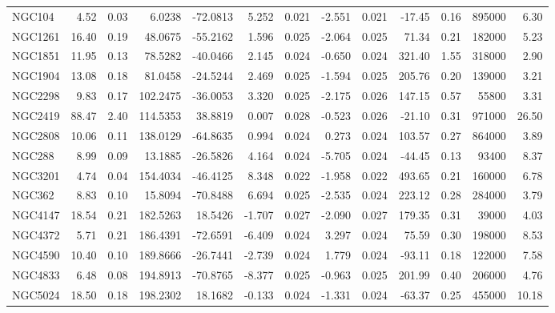 \begin{longtable}{ | l | r | r| r | r | r | r | r | r | r | r | r | r  |}
            NGC104        &   4.52 & 0.03 &   6.0238 & -72.0813 &   5.252 & 0.021 &  -2.551 &  0.021 &  -17.45 &  0.16 &  895000 &  6.30\\ 
            NGC1261       &  16.40 & 0.19 &  48.0675 & -55.2162 &   1.596 & 0.025 &  -2.064 &  0.025 &   71.34 &  0.21 &  182000 &  5.23\\ 
            NGC1851       &  11.95 & 0.13 &  78.5282 & -40.0466 &   2.145 & 0.024 &  -0.650 &  0.024 &  321.40 &  1.55 &  318000 &  2.90\\ 
            NGC1904       &  13.08 & 0.18 &  81.0458 & -24.5244 &   2.469 & 0.025 &  -1.594 &  0.025 &  205.76 &  0.20 &  139000 &  3.21\\ 
            NGC2298       &   9.83 & 0.17 & 102.2475 & -36.0053 &   3.320 & 0.025 &  -2.175 &  0.026 &  147.15 &  0.57 &   55800 &  3.31\\ 
            NGC2419       &  88.47 & 2.40 & 114.5353 &  38.8819 &   0.007 & 0.028 &  -0.523 &  0.026 &  -21.10 &  0.31 &  971000 & 26.50\\ 
            NGC2808       &  10.06 & 0.11 & 138.0129 & -64.8635 &   0.994 & 0.024 &   0.273 &  0.024 &  103.57 &  0.27 &  864000 &  3.89\\ 
            NGC288        &   8.99 & 0.09 &  13.1885 & -26.5826 &   4.164 & 0.024 &  -5.705 &  0.024 &  -44.45 &  0.13 &   93400 &  8.37\\ 
            NGC3201       &   4.74 & 0.04 & 154.4034 & -46.4125 &   8.348 & 0.022 &  -1.958 &  0.022 &  493.65 &  0.21 &  160000 &  6.78\\ 
            NGC362        &   8.83 & 0.10 &  15.8094 & -70.8488 &   6.694 & 0.025 &  -2.535 &  0.024 &  223.12 &  0.28 &  284000 &  3.79\\ 
            NGC4147       &  18.54 & 0.21 & 182.5263 &  18.5426 &  -1.707 & 0.027 &  -2.090 &  0.027 &  179.35 &  0.31 &   39000 &  4.03\\ 
            NGC4372       &   5.71 & 0.21 & 186.4391 & -72.6591 &  -6.409 & 0.024 &   3.297 &  0.024 &   75.59 &  0.30 &  198000 &  8.53\\ 
            NGC4590       &  10.40 & 0.10 & 189.8666 & -26.7441 &  -2.739 & 0.024 &   1.779 &  0.024 &  -93.11 &  0.18 &  122000 &  7.58\\ 
            NGC4833       &   6.48 & 0.08 & 194.8913 & -70.8765 &  -8.377 & 0.025 &  -0.963 &  0.025 &  201.99 &  0.40 &  206000 &  4.76\\ 
            NGC5024       &  18.50 & 0.18 & 198.2302 &  18.1682 &  -0.133 & 0.024 &  -1.331 &  0.024 &  -63.37 &  0.25 &  455000 & 10.18\\ 

\end{longtable}
